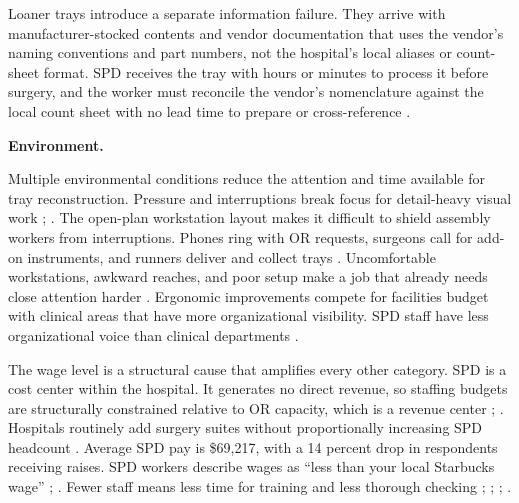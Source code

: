 \documentclass[10pt,a4paper]{article}
\begin{document}
Loaner trays introduce a separate information failure. They arrive with
manufacturer-stocked contents and vendor documentation that uses the vendor's
naming conventions and part numbers, not the hospital's local aliases or
count-sheet format. SPD receives the tray with hours or minutes to process it
before surgery, and the worker must reconcile the vendor's nomenclature against
the local count sheet with no lead time to prepare or cross-reference
\cite{steris-loaner-trays-2021}.

\textbf{Environment.}

Multiple environmental conditions reduce the attention and time available for
tray reconstruction. Pressure and interruptions break focus for detail-heavy
visual work
\cite{alfred-et-al-2021};
\cite{huang-et-al-2025}. The open-plan
workstation layout makes it difficult to shield assembly workers from
interruptions. Phones ring with OR requests, surgeons call for add-on
instruments, and runners deliver and collect trays
\cite{huang-et-al-2025}. Uncomfortable workstations, awkward reaches, and poor
setup make a job that already needs close attention harder
\cite{osha-central-sterile-supply-accessed-2026}. Ergonomic improvements compete
for facilities budget with clinical areas that have more organizational
visibility. SPD staff have less organizational voice than clinical departments
\cite{surgical-directions-spd-invisible-2025}.

The wage level is a structural cause that amplifies every other category. SPD is
a cost center within the hospital. It generates no direct revenue, so staffing
budgets are structurally constrained relative to OR capacity, which is a revenue
center
\cite{steris-capital-budgeting-2024};
\cite{moab-healthcare-spd-cost-center-2024}. Hospitals routinely add surgery
suites without proportionally increasing SPD headcount
\cite{ingold-2025}. Average
SPD pay is \$69,217, with a 14 percent drop in respondents receiving raises. SPD
workers describe wages as ``less than your local Starbucks wage''
\cite{nadeau-2023-spd-salary-survey};
\cite{perry-circulating-life-spd-2022}. Fewer
staff means less time for training and less thorough checking
\cite{alfred-et-al-2021};
\cite{aorn-staffing-shortage-2025};
\cite{macola-et-al-2025};
\cite{brozak-2025}.
\end{document}
